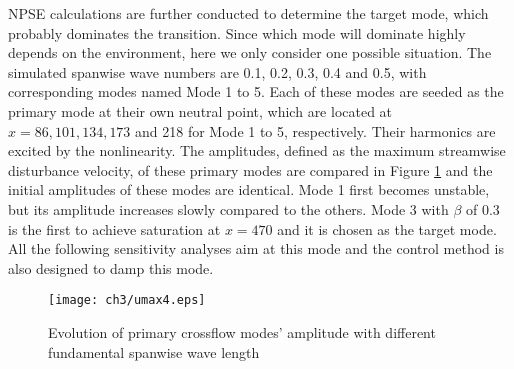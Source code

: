 NPSE calculations are further conducted to determine the target mode, which probably dominates the transition. Since which mode will dominate highly depends on the environment, here we only consider one possible situation. The simulated spanwise wave numbers are 0.1, 0.2, 0.3, 0.4 and 0.5, with corresponding modes named Mode 1 to 5. Each of these modes are seeded as the primary mode at their own neutral point, which are located at $x=86,101,134,173$ and 218 for Mode 1 to 5, respectively. Their harmonics are excited by the nonlinearity. The amplitudes, defined as the maximum streamwise disturbance velocity, of these primary modes are compared in Figure \ref{f:findtarget} and the initial amplitudes of these modes are identical. Mode 1 first becomes unstable, but its amplitude increases slowly compared to the others. Mode 3 with $\beta$ of 0.3 is the first to achieve saturation at $x = 470$ and it is chosen as the target mode. All the following sensitivity analyses aim at this mode and the control method is also designed to damp this mode.
\begin{figure}
  \centering
  \texttt{[image: ch3/umax4.eps]}\\
  \caption{Evolution of primary crossflow modes' amplitude with different fundamental spanwise wave length}\label{f:findtarget}
\end{figure}
